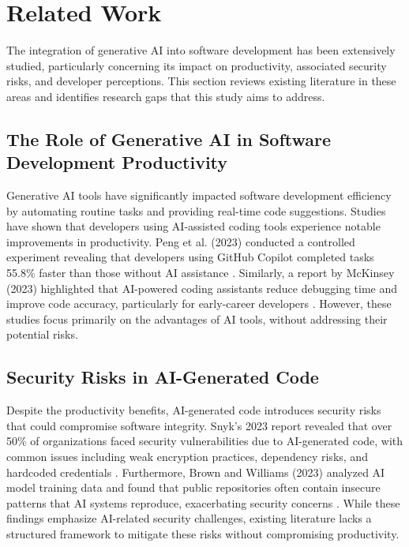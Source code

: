 \section{Related Work}
The integration of generative AI into software development has been extensively studied, particularly concerning its impact on productivity, associated security risks, and developer perceptions. This section reviews existing literature in these areas and identifies research gaps that this study aims to address.

\subsection{The Role of Generative AI in Software Development Productivity}
Generative AI tools have significantly impacted software development efficiency by automating routine tasks and providing real-time code suggestions. Studies have shown that developers using AI-assisted coding tools experience notable improvements in productivity. Peng et al. (2023) conducted a controlled experiment revealing that developers using GitHub Copilot completed tasks 55.8\% faster than those without AI assistance \cite{peng2023}. Similarly, a report by McKinsey (2023) highlighted that AI-powered coding assistants reduce debugging time and improve code accuracy, particularly for early-career developers \cite{mckinsey2023}. However, these studies focus primarily on the advantages of AI tools, without addressing their potential risks.


\subsection{Security Risks in AI-Generated Code}
Despite the productivity benefits, AI-generated code introduces security risks that could compromise software integrity. Snyk's 2023 report revealed that over 50\% of organizations faced security vulnerabilities due to AI-generated code, with common issues including weak encryption practices, dependency risks, and hardcoded credentials \cite{snyk2023}. Furthermore, Brown and Williams (2023) analyzed AI model training data and found that public repositories often contain insecure patterns that AI systems reproduce, exacerbating security concerns \cite{ai-training-risks}. While these findings emphasize AI-related security challenges, existing literature lacks a structured framework to mitigate these risks without compromising productivity.

